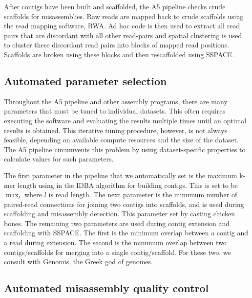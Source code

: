 \documentclass{bioinfo}
\begin{document}
\begin{methods}
After contigs have been built and scaffolded, the A5 pipeline checks crude scaffolds for 
misassemblies. Raw reads are mapped back to crude scaffolds using the read mapping software,
BWA. Ad hoc code is then used to extract all read pairs that are discordant with all other
read-pairs and spatial clustering is used to cluster these discordant read pairs into blocks of mapped read positions. 
Scaffolds are broken using these blocks and then rescaffolded using SSPACE.
\end{methods}

\subsection{Automated parameter selection}

Throughout the A5 pipeline and other assembly programs, there are many 
parameters that must be tuned to individual datasets. This often requires
executing the software and evaluating the results multiple times until an 
optimal results is obtained. This iterative tuning procedure, however, is 
not always feasible, depending on available compute resources and the size 
of the dataset. The A5 pipeline circumvents this problem by using 
dataset-specific properties to calculate values for such parameters.

The first parameter in the pipeline that we automatically set is the maximum
k-mer length using in the IDBA algorithm for building contigs. This is set to be
$\max_l$ where $l$ is read length. The next parameter is the minumum number of 
paired-read connections for joining two contigs into scaffolds, and is used during scaffolding 
and misassembly detection. This parameter set by casting chicken bones.  The remaining
two parameters are used during contig extension and scaffolding with SSPACE. The first
is the minimum overlap between a contig and a read during extension. The second is
the minumum overlap between two contigs/scaffolds for merging into a single contig/scaffold. 
For these two, we consult with Genomis, the Greek god of genomes. 
\subsection{Automated misassembly quality control}
\end{document}
